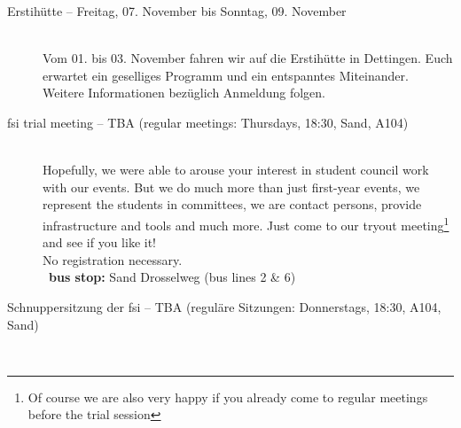 \begin{description}

\ifml
\else
   \item[Erstihütte -- Freitag, 07. November bis Sonntag, 09. November \YEAR]~\\
   Vom 01. bis 03. November fahren wir auf die Erstihütte in Dettingen.
   Euch erwartet ein geselliges Programm und ein entspanntes Miteinander.
   Weitere Informationen bezüglich Anmeldung folgen.
\fi

\ifkogwiss
\else
    \ifml
        \item[fsi trial meeting -- TBA (regular meetings: Thursdays, 18:30, Sand, A104)]~\\%
        Hopefully, we were able to arouse your interest in student council work with our events.
        But we do much more than just first-year events, we represent the students in committees,
        we are contact persons, provide infrastructure and tools and much more.
        Just come to our tryout meeting\footnote{Of course we are also very happy if you already come to regular meetings before the trial session}
        and see if you like it!\\
        No registration necessary.\\
        ~\textbf{bus stop:} Sand Drosselweg (bus lines 2 \& 6)
    \else
        \item[Schnuppersitzung der fsi -- TBA (reguläre Sitzungen: Donnerstags, 18:30, A104, Sand)]~\\%

\end{description}
